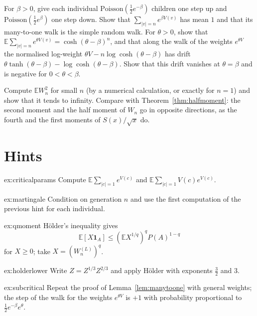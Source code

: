 \begin{exercise}[$\star\star$]\label{ex:subcritical}
For $\beta>0$, give each individual $\mathrm{Poisson}(\frac12e^{-\beta})$ children one step up and $\mathrm{Poisson}(\frac12e^{\beta})$ one step down. Show that $\sum_{|v|=n}e^{\beta V(v)}$ has mean $1$ and that its many-to-one walk is the simple random walk. For $\theta>0$, show that $\mathbb E\sum_{|v|=n}e^{\theta V(v)}=\cosh(\theta-\beta)^n$, and that along the walk of the weights $e^{\theta V}$ the normalised log-weight $\theta V-n\log\cosh(\theta-\beta)$ has drift $\theta\tanh(\theta-\beta)-\log\cosh(\theta-\beta)$. Show that this drift vanishes at $\theta=\beta$ and is negative for $0<\theta<\beta$.
\end{exercise}

\begin{exercise}[$\star$]\label{ex:fourthmomentgap}
Compute $\mathbb EW_n^2$ for small $n$ (by a numerical calculation, or exactly for $n=1$) and show that it tends to infinity. Compare with Theorem~\ref{thm:halfmoment}: the second moment and the half moment of $W_n$ go in opposite directions, as the fourth and the first moments of $S(x)/\sqrt x$ do.
\end{exercise}

\section{Hints}

\begin{hint}{ex:criticalparams}
Compute $\mathbb E\sum_{|c|=1}e^{V(c)}$ and $\mathbb E\sum_{|c|=1}V(c)e^{V(c)}$.
\end{hint}

\begin{hint}{ex:martingale}
Condition on generation $n$ and use the first computation of the previous hint for each individual.
\end{hint}

\begin{hint}{ex:qmoment}
Hölder's inequality gives
\[
\mathbb E[X\mathbf 1_A]\le(\mathbb EX^{1/q})^q P(A)^{1-q}
\]
for $X\ge0$; take $X=(W_n^{(L)})^q$.
\end{hint}

\begin{hint}{ex:holderlower}
Write $Z=Z^{1/3}Z^{2/3}$ and apply Hölder with exponents $\frac32$ and $3$.
\end{hint}

\begin{hint}{ex:subcritical}
Repeat the proof of Lemma~\ref{lem:manytoone} with general weights; the step of the walk for the weights $e^{\theta V}$ is $+1$ with probability proportional to $\frac12e^{-\beta}e^{\theta}$.
\end{hint}

